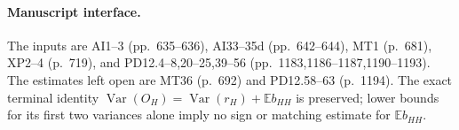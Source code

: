 \documentclass[11pt]{article}
\newcommand{\E}{\mathbb E}
\newcommand{\Var}{\operatorname{Var}}
\begin{document}
\paragraph{Manuscript interface.}
The inputs are AI1--3 (pp.~635--636), AI33--35d (pp.~642--644), MT1
(p.~681), XP2--4 (p.~719), and PD12.4--8,20--25,39--56
(pp.~1183,1186--1187,1190--1193). The estimates left open
are MT36 (p.~692) and PD12.58--63 (p.~1194). The exact terminal identity
$\Var(O_H)=\Var(r_H)+\E b_{HH}$ is preserved; lower bounds for its first
two variances alone imply no sign or matching estimate for $\E b_{HH}$.
\end{document}

